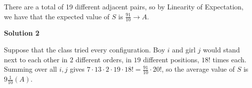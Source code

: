 \begin{enumerate}
 There are a total of 19 different adjacent pairs, so by Linearity of Expectation, we have that the expected value of $S$ is $\frac{91}{10} \to \boxed{A}$.

 



\textbf{Solution 2}

Suppose that the class tried every configuration. Boy $i$ and girl $j$ would stand next to each other in $2$ different orders, in $19$ different positions, $18!$ times each. Summing over all $i,j$ gives $7\cdot13\cdot2\cdot19\cdot18!=\frac{91}{10}\cdot20!$, so the average value of $S$ is $\boxed{9\frac1{10}(A)}$.

 


\end{enumerate}